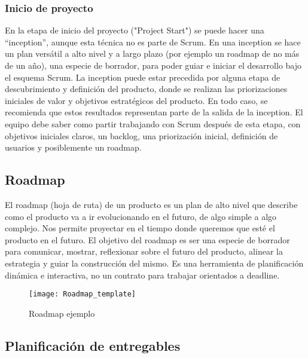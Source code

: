 \subsubsection{Inicio de proyecto}

En la etapa de inicio del proyecto ("Project Start") se puede hacer una “inception”, aunque esta técnica no es parte de Scrum. En una inception se hace un plan versátil a alto nivel y a largo plazo (por ejemplo un roadmap de no más de un año), una especie de borrador, para poder guiar e iniciar el desarrollo bajo el esquema Scrum. La inception puede estar precedida por alguna etapa de descubrimiento y definición del producto, donde se realizan las priorizaciones iniciales de valor y objetivos estratégicos del producto. En todo caso, se recomienda que estos resultados representan parte de la salida de la inception. El equipo debe saber como partir trabajando con Scrum después de esta etapa, con objetivos iniciales claros, un backlog, una priorización inicial, definición de usuarios y posiblemente un roadmap.

\subsection{Roadmap}

El roadmap (hoja de ruta) de un producto es un plan de alto nivel que describe como el producto va a ir evolucionando en el futuro, de algo simple a algo complejo. Nos permite proyectar en el tiempo donde queremos que esté el producto en el futuro. El objetivo del roadmap es ser una especie de borrador para comunicar, mostrar, reflexionar sobre el futuro del producto, alinear la estrategia y guiar la construcción del mismo. Es una herramienta de planificación dinámica e interactiva, no un contrato para trabajar orientados a deadline.

\begin{figure}[h]
  \centering
  \texttt{[image: Roadmap\_template]}
  \caption{Roadmap ejemplo}
  \centering
  \label{fig:Roadmap_template} %
\end{figure}
\FloatBarrier %

\subsection{Planificación de entregables}

